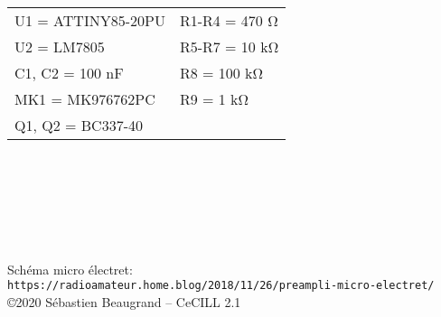 \documentclass{kibot}
\begin{document}
\begin{center}
~\\
~\\
\\
~\\
~\\
\begin{tabular}{ll}
U1 = ATTINY85-20PU & R1-R4 = 470 \si{\ohm}\\
U2 = LM7805 & R5-R7 = 10 \si{\kilo\ohm}\\
C1, C2 = 100 \si{\nano\farad} & R8 = 100 \si{\kilo\ohm}\\
MK1 = MK976762PC & R9 = 1 \si{\kilo\ohm}\\
Q1, Q2 = BC337-40\\
\end{tabular}
\\
~\\
\\
~\\
~\\
~\\
Schéma micro électret:
\texttt{\small https://radioamateur.home.blog/2018/11/26/preampli-micro-electret/}\\
\vfill
\scriptsize
\copyright 2020 Sébastien Beaugrand -- CeCILL 2.1
\end{center}
\end{document}
